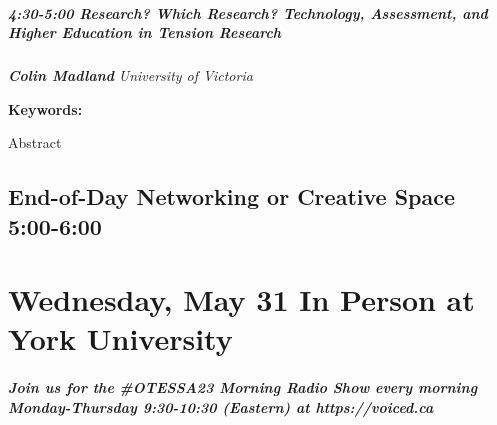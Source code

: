 \documentclass[
]{book}
\begin{document}
\begin{session}
\hypertarget{research-which-research-technology-assessment-and-higher-education-in-tension-research}{%
\paragraph*{\texorpdfstring{4:30-5:00 \textbar{} \textbf{Research? Which
Research? Technology, Assessment, and Higher Education in Tension}
\textbar{}
Research}{4:30-5:00 \textbar{} Research? Which Research? Technology, Assessment, and Higher Education in Tension \textbar{} Research}}\label{research-which-research-technology-assessment-and-higher-education-in-tension-research}}

\textbf{\emph{Colin Madland}} \textbar{} \emph{University of Victoria}

\textbf{Keywords:}

Abstract
\end{session}

\hypertarget{end-of-day-networking-or-creative-space-500-600-1}{%
\section*{End-of-Day Networking or Creative Space \textbar{} 5:00-6:00}\label{end-of-day-networking-or-creative-space-500-600-1}}

\hypertarget{wednesday-may-31-in-person-at-york-university}{%
\chapter{Wednesday, May 31 \textbar{} In Person at York University}\label{wednesday-may-31-in-person-at-york-university}}

\begin{protip}
\hypertarget{join-us-for-the-otessa23-morning-radio-show-every-morning-monday-thursday-930-1030-eastern-at-httpsvoiced.ca}{%
\paragraph{Join us for the \#OTESSA23 Morning Radio Show every morning
Monday-Thursday 9:30-10:30 (Eastern) at
https://voiced.ca}\label{join-us-for-the-otessa23-morning-radio-show-every-morning-monday-thursday-930-1030-eastern-at-httpsvoiced.ca}}
\end{protip}
\end{document}
